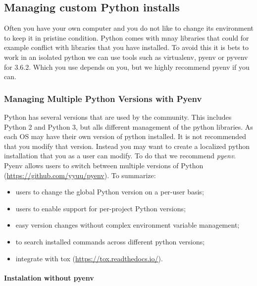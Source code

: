 \subsection{Managing custom Python
installs}\label{managing-custom-python-installs}

Often you have your own computer and you do not like to change its
environment to keep it in pristine condition. Python comes with mnay
libraries that could for example conflict with libraries that you have
installed. To avoid this it is bets to work in an isolated python we can
use tools such as virtualenv, pyenv or pyvenv for 3.6.2. Which you use
depends on you, but we highly recommend pyenv if you can.

\subsubsection{Managing Multiple Python Versions with
Pyenv}\label{managing-multiple-python-versions-with-pyenv}

Python has several versions that are used by the community. This
includes Python 2 and Python 3, but alls different management of the
python libraries. As each OS may have their own version of python
installed. It is not recommended that you modify that version. Instead
you may want to create a localized python installation that you as a
user can modify. To do that we recommend \emph{pyenv}. Pyenv allows
users to switch between multiple versions of Python
(\url{https://github.com/yyuu/pyenv}). To summarize:

\begin{itemize}

\item
  users to change the global Python version on a per-user basis;
\item
  users to enable support for per-project Python versions;
\item
  easy version changes without complex environment variable management;
\item
  to search installed commands across different python versions;
\item
  integrate with tox (\url{https://tox.readthedocs.io/}).
\end{itemize}

\paragraph{Instalation without pyenv}\label{instalation-without-pyenv}

